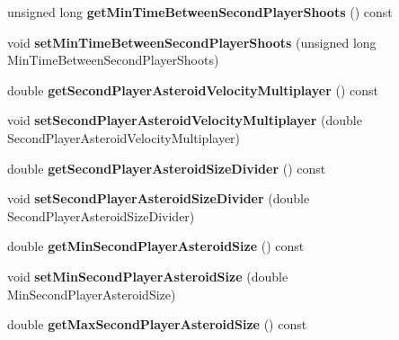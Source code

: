 \begin{DoxyCompactItemize}
\item 
unsigned long {\bfseries get\+Min\+Time\+Between\+Second\+Player\+Shoots} () const \hypertarget{classGameConfiguration_a9e879a96422309a56dd55aacc59340e7}{}\label{classGameConfiguration_a9e879a96422309a56dd55aacc59340e7}

\item 
void {\bfseries set\+Min\+Time\+Between\+Second\+Player\+Shoots} (unsigned long Min\+Time\+Between\+Second\+Player\+Shoots)\hypertarget{classGameConfiguration_a16fd8d0740fcb8b402f302514e2f257e}{}\label{classGameConfiguration_a16fd8d0740fcb8b402f302514e2f257e}

\item 
double {\bfseries get\+Second\+Player\+Asteroid\+Velocity\+Multiplayer} () const \hypertarget{classGameConfiguration_a524ac4cd586a42bdbe49b75d93efa0cf}{}\label{classGameConfiguration_a524ac4cd586a42bdbe49b75d93efa0cf}

\item 
void {\bfseries set\+Second\+Player\+Asteroid\+Velocity\+Multiplayer} (double Second\+Player\+Asteroid\+Velocity\+Multiplayer)\hypertarget{classGameConfiguration_ad0ccfa32f5d4885b01635207005f945d}{}\label{classGameConfiguration_ad0ccfa32f5d4885b01635207005f945d}

\item 
double {\bfseries get\+Second\+Player\+Asteroid\+Size\+Divider} () const \hypertarget{classGameConfiguration_adbaf033a5a169fa357a75582cba19f6a}{}\label{classGameConfiguration_adbaf033a5a169fa357a75582cba19f6a}

\item 
void {\bfseries set\+Second\+Player\+Asteroid\+Size\+Divider} (double Second\+Player\+Asteroid\+Size\+Divider)\hypertarget{classGameConfiguration_ae30b6a490141f7df327f9ce6622e6bd3}{}\label{classGameConfiguration_ae30b6a490141f7df327f9ce6622e6bd3}

\item 
double {\bfseries get\+Min\+Second\+Player\+Asteroid\+Size} () const \hypertarget{classGameConfiguration_a93317a57ca18286a7ec523969d6da306}{}\label{classGameConfiguration_a93317a57ca18286a7ec523969d6da306}

\item 
void {\bfseries set\+Min\+Second\+Player\+Asteroid\+Size} (double Min\+Second\+Player\+Asteroid\+Size)\hypertarget{classGameConfiguration_a0075edec70545f10661e4f0df489fd36}{}\label{classGameConfiguration_a0075edec70545f10661e4f0df489fd36}

\item 
double {\bfseries get\+Max\+Second\+Player\+Asteroid\+Size} () const \hypertarget{classGameConfiguration_a039d07fa3d4253f3a8125338a904af63}{}\label{classGameConfiguration_a039d07fa3d4253f3a8125338a904af63}


\end{DoxyCompactItemize}
